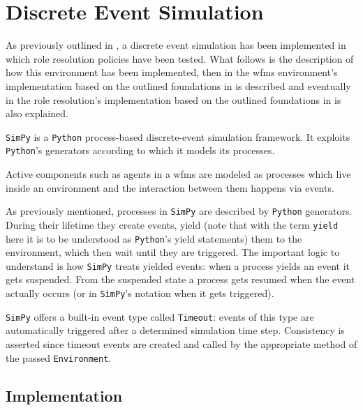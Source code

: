 \chapter{Discrete Event Simulation}
\label{ch:discrete_event_sim}

As previously outlined in , a discrete event simulation has been implemented in which role resolution policies have been tested. What follows is the description of how this environment has been implemented, then in  the \gls{wfms} environment's implementation based on the outlined foundations in  is described and eventually in  the role resolution's implementation based on the outlined foundations in  is also explained.

\texttt{SimPy} is a \texttt{Python} process-based discrete-event simulation framework. It exploits \texttt{Python}'s generators according to which it models its processes.

Active components such as agents in a \gls{wfms} are modeled as processes which live inside an environment and the interaction between them happens via events.

As previously mentioned, processes in \texttt{SimPy} are described by \texttt{Python} generators. During their lifetime they create events, yield (note that with the term \texttt{yield} here it is to be understood as \texttt{Python}'s yield statements) them to the environment, which then wait until they are triggered. The important logic to understand is how \texttt{SimPy} treats yielded events: when a process yields an event it gets suspended. From the suspended state a process gets resumed when the event actually occurs (or in \texttt{SimPy}'s notation when it gets triggered).

\texttt{SimPy} offers a built-in event type called \texttt{Timeout}: events of this type are automatically triggered after a determined simulation time step. Consistency is asserted since timeout events are created and called by the appropriate method of the passed \texttt{Environment}.

\section{ Implementation}
\label{sec:wfms_implementation}

